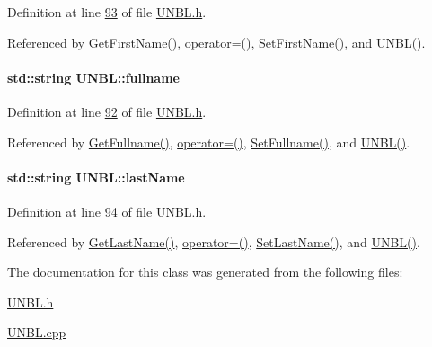 Definition at line \hyperlink{_u_n_b_l_8h_source_l00093}{93} of file \hyperlink{_u_n_b_l_8h_source}{U\+N\+B\+L.\+h}.



Referenced by \hyperlink{_u_n_b_l_8cpp_source_l00094}{Get\+First\+Name()}, \hyperlink{_u_n_b_l_8h_source_l00062}{operator=()}, \hyperlink{_u_n_b_l_8cpp_source_l00090}{Set\+First\+Name()}, and \hyperlink{_u_n_b_l_8h_source_l00024}{U\+N\+B\+L()}.

\paragraph[{\texorpdfstring{fullname}{fullname}}]{\setlength{\rightskip}{0pt plus 5cm}std\+::string U\+N\+B\+L\+::fullname\hspace{0.3cm}{\ttfamily [private]}}\hypertarget{class_u_n_b_l_a67deb62f553fe1ece6feb73f12898e7a_a67deb62f553fe1ece6feb73f12898e7a}{}\label{class_u_n_b_l_a67deb62f553fe1ece6feb73f12898e7a_a67deb62f553fe1ece6feb73f12898e7a}


Definition at line \hyperlink{_u_n_b_l_8h_source_l00092}{92} of file \hyperlink{_u_n_b_l_8h_source}{U\+N\+B\+L.\+h}.



Referenced by \hyperlink{_u_n_b_l_8cpp_source_l00102}{Get\+Fullname()}, \hyperlink{_u_n_b_l_8h_source_l00062}{operator=()}, \hyperlink{_u_n_b_l_8cpp_source_l00098}{Set\+Fullname()}, and \hyperlink{_u_n_b_l_8h_source_l00024}{U\+N\+B\+L()}.

\paragraph[{\texorpdfstring{last\+Name}{lastName}}]{\setlength{\rightskip}{0pt plus 5cm}std\+::string U\+N\+B\+L\+::last\+Name\hspace{0.3cm}{\ttfamily [private]}}\hypertarget{class_u_n_b_l_a3f42790177cbe310536f53a7369ee194_a3f42790177cbe310536f53a7369ee194}{}\label{class_u_n_b_l_a3f42790177cbe310536f53a7369ee194_a3f42790177cbe310536f53a7369ee194}


Definition at line \hyperlink{_u_n_b_l_8h_source_l00094}{94} of file \hyperlink{_u_n_b_l_8h_source}{U\+N\+B\+L.\+h}.



Referenced by \hyperlink{_u_n_b_l_8cpp_source_l00086}{Get\+Last\+Name()}, \hyperlink{_u_n_b_l_8h_source_l00062}{operator=()}, \hyperlink{_u_n_b_l_8cpp_source_l00082}{Set\+Last\+Name()}, and \hyperlink{_u_n_b_l_8h_source_l00024}{U\+N\+B\+L()}.



The documentation for this class was generated from the following files\+:\begin{DoxyCompactItemize}
\item 
\hyperlink{_u_n_b_l_8h}{U\+N\+B\+L.\+h}\item 
\hyperlink{_u_n_b_l_8cpp}{U\+N\+B\+L.\+cpp}\end{DoxyCompactItemize}
